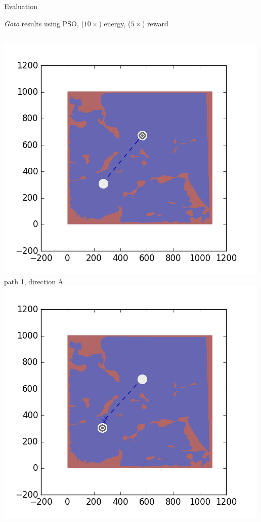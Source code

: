 \documentclass[9pt]{beamer}
\begin{document}
\begin{frame}{Evaluation}
    \begin{block}{\textit{Goto} results using PSO, ($10\times$) energy, ($5\times$) reward}
        \begin{columns}
            \begin{column}{0.33\textwidth}
                \begin{center}
                    \includegraphics[width=\textwidth,trim={2cm 2cm 2cm 2cm},clip]{img/EXP3RG_PathAa_-1_-1_0d01_0d005.png}
                    \newline
                    \tiny{path 1, direction A}
                    \newline
                    \includegraphics[width=\textwidth,trim={2cm 2cm 2cm 2cm},clip]{img/EXP3RG_PathAb_-1_-1_0d01_0d005.png}

\end{center}
\end{column}
\end{columns}
\end{block}
\end{frame}
\end{document}
